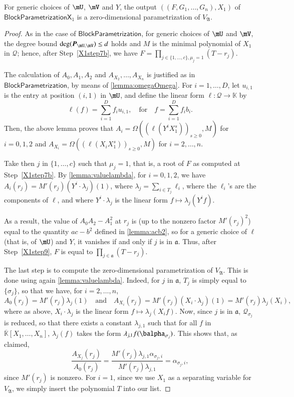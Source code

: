 \documentclass[final,1p,times,authoryear]{elsarticle}
\newcommand{\mat}[1]{\bm{\MakeUppercase{#1}}} %
\newcommand{\mainalgoname}{\mathsf{ BlockParametrization}}
\newcommand{\mf}{Y}
\newcommand{\residueI}{\mathscr{Q}}
\def\K{\mathbb{K}}
\def\K {\ensuremath{\mathbb{K}}}
\def\Kbar {{\ensuremath{\overline{\mathbb{K}}}}}
\begin{document}
\begin{lemma}
  For generic choices of $\mU$, $\mV$ and $\mf$, the output
  $((F,G_1,\dots,G_n),X_1)$ of $\mathsf{BlockParametrizationX}_1$ is a
  zero-dimensional parametrization of $V_{\mathfrak{A}}$.
\end{lemma}
\begin{proof}
  As in the case of $\mainalgoname$, for generic choices of $\mU$ and
  $\mV$, the degree bound $\deg(\mat{P}_{\mU,\mV}) \le d$ holds and
  $M$ is the minimal polynomial of $X_1$ in $\residueI$; hence, after
  Step~\ref{X1step7b}, we have $F=\prod_{j \in \{1,\dots,c\}, \mu_j=1}
  (T-r_j)$. 

  The calculation of $A_0,A_1,A_2$ and $A_{X_2},\dots,A_{X_n}$ is
  justified as in $\mainalgoname$, by means of
  \cref{lemma:omegaOmega}. For $i=1,\dots,D$, let $u_{i,1}$ is the entry at position
  $(i,1)$ in $\mU$, and define the linear 
  form $\ell: \residueI \to \K$ by 
  $$\ell(f) = \sum_{i=1}^D f_i u_{i,1}, \quad\text{for}\quad f =
  \sum_{i=1}^D f_i b_i.$$ Then, the above lemma proves that $A_i =
  \Omega((\ell(\mf^i X_1^s))_{s\ge0},M)$ for $i=0,1,2$ and $A_{X_i} =
  \Omega((\ell(X_i X_1^s))_{s\ge0},M)$ for $i=2,\dots,n$.

  Take then $j$ in $\{1,\dots,c\}$ such that $\mu_j=1$, that is, a
  root of $F$ as computed at Step~\ref{X1step7b}. By
  \cref{lemma:valuelambda}, for $i=0,1,2$, we have $ A_i(r_j) = M'(r_j)
  (\mf^i \cdot \lambda_j)(1)$, where $\lambda_j =\sum_{i \in T_j}
  \ell_i$, where the $\ell_i$'s are the components of $\ell$,
  and where $\mf^i \cdot \lambda_j$ is the linear form $f \mapsto \lambda_j(\mf^i f)$.

  As a result, the value of $ A_0  A_2 -  A_1^2$ at
  $r_j$ is (up to the nonzero factor $M'(r_j)^2$) equal to the
  quantity $ac-b^2$ defined in \cref{lemma:acb2}, so for a
  generic choice of $\ell$ (that is, of $\mU$) and $\mf$, it vanishes if and only if $j$ is
  in $\mathfrak{a}$. Thus, after Step~\ref{X1step9}, 
  $F$ is equal to $\prod_{j \in \mathfrak{a}} (T-r_j)$.

  The last step is to compute the zero-dimensional parametrization of
  $V_{\mathfrak{A}}$. This is done using again
  \cref{lemma:valuelambda}. Indeed, for $j$ in $\mathfrak{a}$, 
  $T_j$ is simply equal to $\{\sigma_j\}$, so that we have, for $i=2,\dots,n$,
  $$ A_0(r_j)=M'(r_j) \lambda_j(1) \quad\text{and}\quad 
  A_{X_i}(r_j) = M'(r_j) (X_i \cdot \lambda_j)(1) = M'(r_j) \lambda_j(X_i),$$
  where as above, $X_i \cdot \lambda_j$ is the linear form $f \mapsto \lambda_j(X_i f)$.
  Now, since $j$
  is in $\mathfrak{a}$, $\residueI_{\sigma_j}$ is reduced, so that there
  exists a constant $\lambda_{j,1}$ such that for all $f$ in
  $\Kbar[X_1,\dots,X_n]$, $\lambda_j(f)$ takes the form $\lambda_{j,1}
  f(\balpha_{\sigma_j})$. This shows that, as claimed,
  $$\frac{ A_{X_j}(r_j)}{ A_0 (r_j)} = 
  \frac
  {M'(r_j) \lambda_{j,1} \alpha_{\sigma_j,i}}{M'(r_j) \lambda_{j,1}} = \alpha_{\sigma_j,i},$$
  since $M'(r_j)$ is nonzero.
  For $i=1$, since we use $X_1$ as a separating variable for $V_{\mathfrak{A}}$, 
  we simply insert the polynomial $T$ into our list.
\end{proof}
\end{document}
